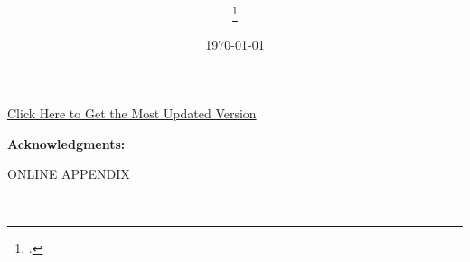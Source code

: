\documentclass[12pt,english]{article}
\begin{document}
\title{
\vspace*{-2em}
\onehalfspacing
\PAPERTITLE
}

\author{
\AUTHORHADAH{} \thanks{
\AUTHORHADAHINFO.
}}

\date{
\vspace*{-1em}
\today
}

\maketitle

\vspace*{-2.75em}
\begin{center}
\href{https://hhadah.github.io/asian-identity-attrition/my_paper/submit_preprint.pdf}{\footnotesize{Click Here to Get the Most Updated Version}}
\end{center}

\thispagestyle{empty}

\vspace*{-0.5em}
\begin{abstract}
\singlespacing
\PAPERABSTRACT
\end{abstract}
\vspace*{-0.5em}
{\small\PAPERKEYWORDS}
\thispagestyle{empty}
\clearpage

\setcounter{page}{1}
\renewcommand*{\thefootnote}{\arabic{footnote}}

\clearpage

\begingroup
{}
\setlength\bibitemsep{5pt}
\printbibliography[title=References]
\endgroup

\newpage
\pagebreak

\vspace{2em}
\noindent\textbf{Acknowledgments:} \ACKNOWLEDGMENTS

\pagebreak



\clearpage

\appendix
\setlength{\footnotemargin}{5.75mm}

\renewcommand*{\thefootnote}{\fnsymbol{footnote}}
\begingroup
  \doublespacing
  \centering
  \Large ONLINE APPENDIX \\
  \LARGE \begin{singlespace}\PAPERTITLE\end{singlespace}
  \large \href{\AUTHORHADAHURL}{\AUTHORHADAH}\\[1.0em]
\endgroup

\newpage

\clearpage
\end{document}
